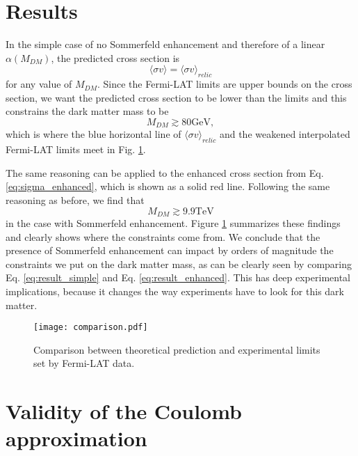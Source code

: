 \section{Results}\label{sec:results}
In the simple case of no Sommerfeld enhancement and therefore of a linear \(\alpha (M_{DM} )\), the predicted cross section is
\begin{equation}
	\langle \sigma v \rangle = \langle \sigma v \rangle _{relic}
\end{equation}
for any value of \(M_{DM} \). Since the Fermi-LAT limits are upper bounds on the cross section, we want the predicted cross section to be lower than the limits and this constrains the dark matter mass to be
\begin{equation}\label{eq:result_simple}
	M_{DM} \gtrsim 80 \mathrm{GeV}, 
\end{equation}
which is where the blue horizontal line of \(\langle \sigma v \rangle _{relic} \) and the weakened interpolated Fermi-LAT limits meet in Fig. \ref{fig:comparison}.

The same reasoning can be applied to the enhanced cross section from Eq. \ref{eq:sigma_enhanced}, which is shown as a solid red line. Following the same reasoning as before, we find that
\begin{equation}\label{eq:result_enhanced}
	M_{DM} \gtrsim 9.9 \mathrm{TeV}
\end{equation}
in the case with Sommerfeld enhancement. Figure \ref{fig:comparison} summarizes these findings and clearly shows where the constraints come from. We conclude that the presence of Sommerfeld enhancement can impact by orders of magnitude the constraints we put on the dark matter mass, as can be clearly seen by comparing Eq. \ref{eq:result_simple} and Eq. \ref{eq:result_enhanced}. This has deep experimental implications, because it changes the way experiments have to look for this dark matter.

\begin{figure}[!ht]
	\centering
	\texttt{[image: comparison.pdf]}
	\caption{Comparison between theoretical prediction and experimental limits set by Fermi-LAT data.}
	\label{fig:comparison}
\end{figure}

\section{Validity of the Coulomb approximation}

